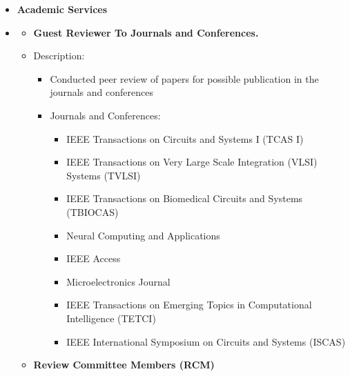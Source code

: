 

\begin {itemize} \item [] {\bf \Large   Academic Services }  \vspace{-1.5em}
\item []  {\bf \hrulefill } \mdseries \normalsize 
    \begin {itemize}
        \item [$\bullet$] \bf {\mtf \normalsize  Guest Reviewer To  Journals and Conferences.} \mdseries
        \item [-]   {   Description:} 
        \begin {itemize}
                        \item [\textbullet] Conducted peer review of papers for possible publication in the  journals and conferences
                    \end {itemize}
            \begin {itemize}
                \item [-]   {   Journals and Conferences:} 
                    \begin {itemize}   
                        \item [\textbullet]  IEEE Transactions on Circuits and Systems  I (TCAS I)
                        \item [\textbullet] IEEE Transactions on Very Large Scale Integration (VLSI) Systems (TVLSI) 
                         \item [\textbullet] IEEE Transactions on Biomedical Circuits and Systems (TBIOCAS)
                          \item [\textbullet] Neural Computing and Applications
                           \item [\textbullet] IEEE Access
                            \item [\textbullet] Microelectronics Journal
                            \item [\textbullet] IEEE Transactions on Emerging Topics in Computational Intelligence (TETCI) 
                             \item [\textbullet] IEEE International Symposium on Circuits and Systems (ISCAS)
                    \end {itemize}
            \end {itemize} \vspace{0.3cm}
     \item [$\bullet$] \bf {\mtf \normalsize Review Committee Members (RCM)} \mdseries

\end{itemize}
\end{itemize}
